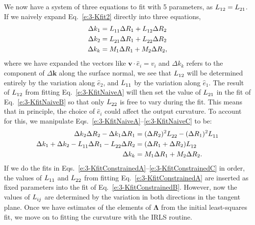We now have a system of three equations to fit with 5 parameters, as $\tensor{L}{_{12}} = \tensor{L}{_{21}}$.
If we naively expand Eq.~\ref{e:3-Kfit2} directly into three equations,
\begin{align}
  \Delta k_1 &= \tensor{L}{_{11}} \Delta R_1 + \tensor{L}{_{12}} \Delta R_2\label{e:3-KfitNaiveA} \\
  \Delta k_2 &= \tensor{L}{_{21}} \Delta R_1 + \tensor{L}{_{22}} \Delta R_2\label{e:3-KfitNaiveB} \\
  \Delta k_k &= M_1 \Delta R_1 + M_2 \Delta R_2,\label{e:3-KfitNaiveC}
\end{align}
where we have expanded the vectors like $\mathbf{v}\cdot \hat{e}_i = v_i$ and $\Delta k_k$ refers to the component of $\Delta \mathbf{k}$ along the surface normal, we see that $\tensor{L}{_{12}}$ will be determined entirely by the variation along $\hat{e}_2$, and $\tensor{L}{_{11}}$ by the variation along $\hat{e}_1$.
The result of $\tensor{L}{_{12}}$ from fitting Eq.~\ref{e:3-KfitNaiveA} will then set the value of $\tensor{L}{_{21}}$ in the fit of Eq.~\ref{e:3-KfitNaiveB} so that only $\tensor{L}{_{22}}$ is free to vary during the fit.
This means that in principle, the choice of $\hat{e}_i$ could affect the output curvature.
To account for this, we manipulate Eqs.~\ref{e:3-KfitNaiveA}--\ref{e:3-KfitNaiveC} to be:
\begin{align}
  \Delta k_2 \Delta R_2 - \Delta k_1 \Delta R_1 &= (\Delta R_2)^2 \tensor{L}{_{22}} - (\Delta R_1)^2 \tensor{L}{_{11}}\label{e:3-KfitConstrainedA}\\
  \Delta k_1 + \Delta k_2 - \tensor{L}{_{11}} \Delta R_1 - \tensor{L}{_{22}} \Delta R_2 &= (\Delta R_1 + \Delta R_2)\tensor{L}{_{12}}\label{e:3-KfitConstrainedB}\\
  \Delta k_k &= M_1 \Delta R_1 + M_2 \Delta R_2.\label{e:3-KfitConstrainedC}
\end{align}
If we do the fits in Eqs.~\ref{e:3-KfitConstrainedA}--\ref{e:3-KfitConstrainedC} in order, the values of $\tensor{L}{_{11}}$ and $\tensor{L}{_{22}}$ from fitting Eq.~\ref{e:3-KfitConstrainedA} are inserted as fixed parameters into the fit of Eq.~\ref{e:3-KfitConstrainedB}.
However, now the values of $\tensor{L}{_{ij}}$ are determined by the variation in both directions in the tangent plane.
Once we have estimates of the elements of $\bm{\Lambda}$ from the initial least-squares fit, we move on to fitting the curvature with the IRLS routine.

